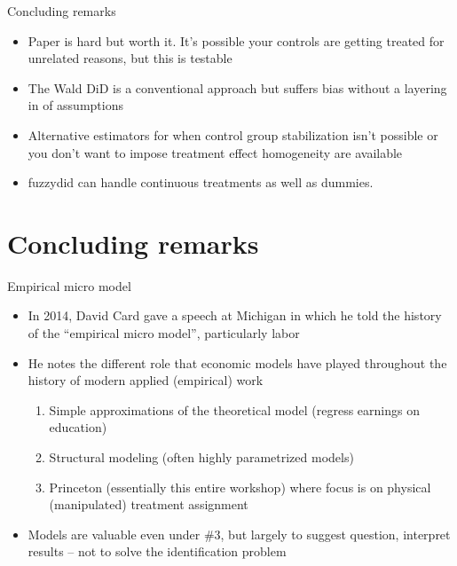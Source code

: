 \documentclass{beamer}
\begin{document}
\begin{frame}{Concluding remarks}

\begin{itemize}
\item Paper is hard but worth it.  It's possible your controls are getting treated for unrelated reasons, but this is testable
\item The Wald DiD is a conventional approach but suffers bias without a layering in of assumptions
\item Alternative estimators for when control group stabilization isn't possible or you don't want to impose treatment effect homogeneity are available
\item fuzzydid can handle continuous treatments as well as dummies.
\end{itemize}

\end{frame}






\section{Concluding remarks}

\begin{frame}{Empirical micro model}
\begin{itemize}

\item In 2014, David Card gave a speech at Michigan in which he told the history of the ``empirical micro model'', particularly labor
\item He notes the different role that economic models have played throughout the history of modern applied (empirical) work
	\begin{enumerate}
	\item Simple approximations of the theoretical model (regress earnings on education)
	\item Structural modeling (often highly parametrized models)
	\item Princeton (essentially this entire workshop) where focus is on physical (manipulated) treatment assignment
	\end{enumerate}
\item Models are valuable even under \#3, but largely to suggest question, interpret results -- not to solve the identification problem
\end{itemize}

\end{frame}
\end{document}
